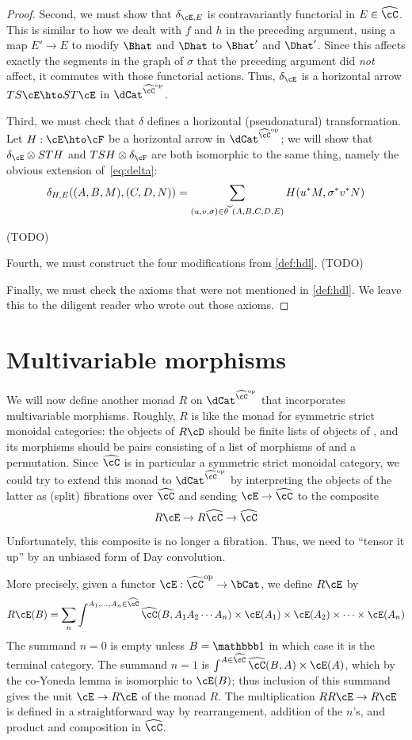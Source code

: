 \documentclass{amsart}
\newcommand{\C}{\cC}
\renewcommand{\Chat}{\ensuremath{\widehat{\C}}\xspace}
\newcommand{\thchk}{\ensuremath{\widecheck{\theta}}\xspace}
\newcommand{\E}{\cE}
\newcommand{\F}{\cF}
\newcommand{\one}{\lone}
\begin{document}
\begin{proof}
  Second, we must show that $\delta_{\E,E}$ is contravariantly functorial in $E\in\Chat$.
  This is similar to how we dealt with $f$ and $h$ in the preceding argument, using a map $E'\to E$ to modify $\Bhat$ and $\Dhat$ to $\Bhat'$ and $\Dhat'$.
  Since this affects exactly the segments in the graph of $\sigma$ that the preceding argument did \emph{not} affect, it commutes with those functorial actions.
  Thus, $\delta_\E$ is a horizontal arrow $TS\E \hto ST\E$ in $\dCat^{\Chat\op}$.

  Third, we must check that $\delta$ defines a horizontal (pseudonatural) transformation.
  Let $H:\E\hto \F$ be a horizontal arrow in $\dCat^{\Chat\op}$; we will show that $\delta_\E \otimes STH$ and $TSH\otimes \delta_\F$ are both isomorphic to the same thing, namely the obvious extension of~\eqref{eq:delta}:
  \[ \delta_{H,E}((A,B,M),(C,D,N)) = \sum_{(u,v,\sigma)\in \thchk(A,B,C,D,E)} H(u^*M,\sigma^*v^*N) \]

  (TODO)

  Fourth, we must construct the four modifications from \cref{def:hdl}.
  (TODO)

  Finally, we must check the axioms that were not mentioned in \cref{def:hdl}.
  We leave this to the diligent reader who wrote out those axioms.
\end{proof}

\section{Multivariable morphisms}
\label{sec:multivar}

We will now define another monad $R$ on $\dCat^{\Chat\op}$ that incorporates multivariable morphisms.
Roughly, $R$ is like the monad for symmetric strict monoidal categories: the objects of $R\cD$ should be finite lists of objects of \cD, and its morphisms should be pairs consisting of a list of morphisms of \cD and a permutation.
Since \Chat is in particular a symmetric strict monoidal category, we could try to extend this monad to $\dCat^{\Chat\op}$ by interpreting the objects of the latter as (split) fibrations over $\Chat$ and sending $\E\to \Chat$ to the composite
\[ R\E \to R\Chat \to \Chat \]
Unfortunately, this composite is no longer a fibration.
Thus, we need to ``tensor it up'' by an unbiased form of Day convolution.

More precisely, given a functor $\E:\Chat\op\to \bCat$, we define $R\E$ by
\[ R\E(B) = \sum_n \int^{A_1,\dots,A_n\in\Chat} \Chat(B,A_1 A_2\cdots A_n) \times \E(A_1)\times \E(A_2)\times \cdots\times \E(A_n) \]
The summand $n=0$ is empty unless $B=\one$ in which case it is the terminal category.
The summand $n=1$ is $\int^{A\in\Chat} \Chat(B,A) \times \E(A)$, which by the co-Yoneda lemma is isomorphic to $\E(B)$; thus inclusion of this summand gives the unit $\E\to R\E$ of the monad $R$.
The multiplication $RR\E\to R\E$ is defined in a straightforward way by rearrangement, addition of the $n$'s, and product and composition in $\Chat$.
\end{document}

